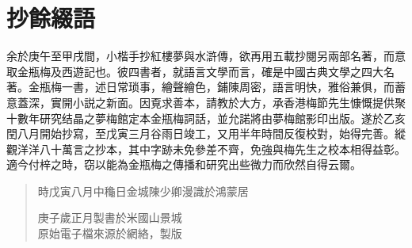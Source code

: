 \chapter*{抄餘綴語}


余於庚午至甲戌間，小楷手抄紅樓夢與水滸傳，欲再用五載抄閱另兩部名著，而意取金瓶梅及西遊記也。彼四書者，就語言文學而言，確是中國古典文學之四大名著。金瓶梅一書，述日常琐事，繪聲繪色，鋪陳周密，語言明快，雅俗兼俱，而蓄意蓋深，實開小説之新面。因覔求善本，請教於大方，承香港梅節先生慷慨提供聚十數年研究结晶之夢梅館定本金瓶梅詞話，並允諾將由夢梅館影印出版。遂於乙亥閏八月開始抄寫，至戊寅三月谷雨日竣工，又用半年時間反復校對，始得完善。縱觀洋洋八十萬言之抄本，其中字跡未免參差不齊，免強與梅先生之校本相得益彰。適今付梓之時，窃以能為金瓶梅之傳播和研究出些微力而欣然自得云爾。

\begin{quotation}
\begin{flushright}時戊寅八月中龝日金城陳少卿漫識於鴻蒙居\end{flushright}

\small\color{gray}
\begin{flushright}
庚子歲正月製書於米國山景城\\
原始電子檔來源於網絡，\quad{\LaTeX}製版
\end{flushright}
\end{quotation}



